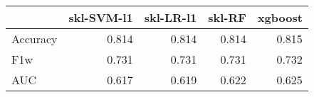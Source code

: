 \begin{tabular}{lrrrr}
\toprule
{} &  skl-SVM-l1 &  skl-LR-l1 &  skl-RF &  xgboost \\
\midrule
Accuracy &       0.814 &      0.814 &   0.814 &    0.815 \\
F1w      &       0.731 &      0.731 &   0.731 &    0.732 \\
AUC      &       0.617 &      0.619 &   0.622 &    0.625 \\
\bottomrule
\end{tabular}
